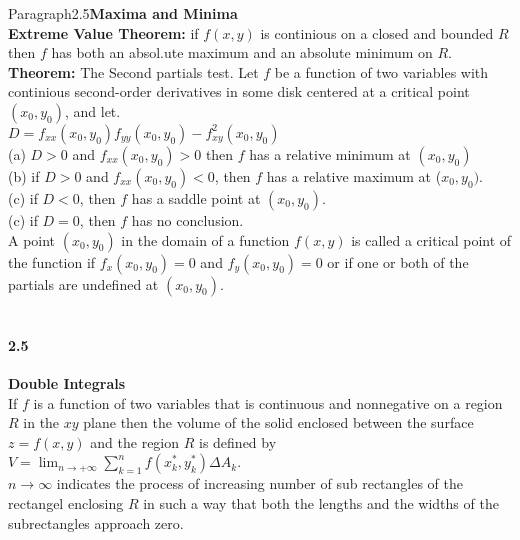 \documentclass[14pt]{extreport}
\begin{document}
Paragraph{2.5}\textbf{Maxima and Minima}\\

\textbf{Extreme Value Theorem:} if $f(x,y)$ is continious on a closed and bounded $R$ then $f$ has both an absol.ute maximum and an absolute minimum on $R$.\\

\textbf{Theorem: }The Second partials test. Let $f$ be a function of two variables with continious second-order derivatives in some disk centered at a critical point $(x_0,y_0)$, and let.\\

$D = f_{xx}(x_0, y_0)f_{yy}(x_0,y_0) - f^2_{xy}(x_0,y_0)$\\

(a) $D > 0$ and $f_{xx}(x_0,y_0) > 0$ then $f$ has a relative minimum at $(x_0,y_0)$\\

(b) if $D > 0$ and $f_{xx}(x_0,y_0) < 0$, then $f$ has a relative maximum at ($x_0, y_0)$.\\

(c) if $D < 0$, then $f$ has a saddle point at $(x_0, y_0)$.\\

(c) if $D = 0$, then $f$ has no conclusion.\\

A point $(x_0, y_0)$ in the domain of a function $f(x,y)$ is called a critical point of the function if $f_x(x_0, y_0) = 0$ and $f_y(x_0, y_0) = 0$ or if one or both of the partials are undefined at $(x_0, y_0)$.\\\\

\paragraph{2.5} \textbf{Double Integrals}\\


If $f$ is a function of two variables that is continuous and nonnegative on a region $R$ in the $xy$ plane then the volume of the solid enclosed between the surface $z = f(x,y)$ and the region $R$ is defined by\\

$V = \lim_{n \to + \infty} \sum^n_{k=1}f(x^*_k, y^*_k) \Delta A_k$.\\

$n \to \infty$ indicates the process of increasing number of sub rectangles of the rectangel enclosing $R$ in such a way that both the lengths and the widths of the subrectangles approach zero.\\
\end{document}
